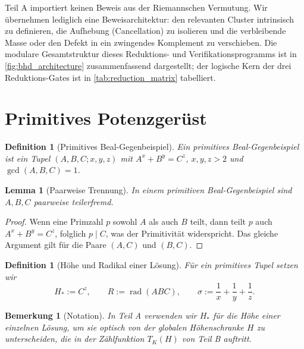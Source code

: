 \documentclass[11pt,a4paper]{article}
\DeclareMathOperator{\rad}{rad}
\newtheorem{lemma}[theorem]{Lemma}
\newtheorem{definition}[theorem]{Definition}
\newtheorem{remark}[theorem]{Bemerkung}
\begin{document}
Teil A importiert keinen Beweis aus der Riemannschen Vermutung. Wir übernehmen lediglich eine Beweisarchitektur: den relevanten Cluster intrinsisch zu definieren, die Aufhebung (Cancellation) zu isolieren und die verbleibende Masse oder den Defekt in ein zwingendes Komplement zu verschieben. Die modulare Gesamtstruktur dieses Reduktions- und Verifikationsprogramms ist in \cref{fig:bhd_architecture} zusammenfassend dargestellt; der logische Kern der drei Reduktions-Gates ist in \cref{tab:reduction_matrix} tabelliert.

\section{Primitives Potenzgerüst}

\begin{definition}[Primitives Beal-Gegenbeispiel]
Ein primitives Beal-Gegenbeispiel ist ein Tupel $(A,B,C;x,y,z)$ mit $A^x+B^y=C^z$, $x,y,z>2$ und $\gcd(A,B,C)=1$.
\end{definition}

\begin{lemma}[Paarweise Trennung]
\label{lem:pairwise}
In einem primitiven Beal-Gegenbeispiel sind $A,B,C$ paarweise teilerfremd.
\end{lemma}

\begin{proof}
Wenn eine Primzahl $p$ sowohl $A$ als auch $B$ teilt, dann teilt $p$ auch $A^x+B^y=C^z$, folglich $p \mid C$, was der Primitivität widerspricht. Das gleiche Argument gilt für die Paare $(A,C)$ und $(B,C)$.
\end{proof}

\begin{definition}[Höhe und Radikal einer Lösung]
Für ein primitives Tupel setzen wir
\[
  H_* := C^z, \qquad R := \rad(ABC), \qquad
  \sigma := \frac1x+\frac1y+\frac1z.
\]
\end{definition}

\begin{remark}[Notation]
In Teil A verwenden wir $H_*$ für die Höhe einer einzelnen Lösung, um sie optisch von der globalen Höhenschranke $H$ zu unterscheiden, die in der Zählfunktion $T_K(H)$ von Teil B auftritt.
\end{remark}
\end{document}

